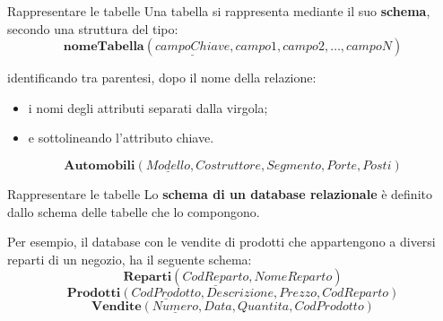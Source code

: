 %
\begin{frame}{Rappresentare le tabelle}
Una tabella si rappresenta mediante il suo \textbf{schema}, secondo una struttura del tipo:
\[ \textbf{nomeTabella}(\underline{campoChiave}, campo1, campo2, \ldots, campoN) \]
\pause

identificando tra parentesi, dopo il nome della relazione:
\pause
\begin{itemize}[<+->]
    \item i nomi degli attributi separati dalla virgola;
    \item e sottolineando l'attributo chiave.
\end{itemize}
\pause

\[ \textbf{Automobili}(\underline{Modello}, Costruttore, Segmento, Porte, Posti) \]
\end{frame}
%
\begin{frame}{Rappresentare le tabelle}
Lo \textbf{schema di un database relazionale} \`e definito dallo schema delle tabelle che lo compongono.

\pause

Per esempio, il database con le vendite di prodotti che appartengono a diversi reparti di un negozio, ha il seguente schema:
\[ \textbf{Reparti}(\underline{CodReparto}, NomeReparto) \]
\[ \textbf{Prodotti}(\underline{CodProdotto}, Descrizione, Prezzo, CodReparto) \]
\[ \textbf{Vendite}(\underline{Numero}, Data, Quantita, CodProdotto) \]
\end{frame}
